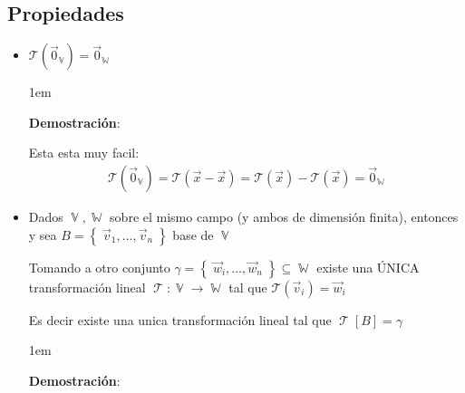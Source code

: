 \documentclass[12pt, fleqn]{report}                             %
\newenvironment{SmallIndentation}[1][0.75em]                    %
        {\begin{adjustwidth}{#1}{}\begin{footnotesize}}             %
        {\end{footnotesize}\end{adjustwidth}}                       %
\theoremstyle{break}                                            %
\DeclareMathOperator \VectorSet    {\mathbb{V}}                 %
\DeclareMathOperator \SubVectorSet {\mathbb{W}}                 %
\DeclareMathOperator \LinTrans {\mathcal{T}}                    %
\newcommand{\Set}[1]    {\left\{ \; #1 \; \right\}}             %
\newcommand{\Wrap}[1]    {\left( #1 \right)}                    %
\newcommand{\FnLinTrans}[1]{\mathcal{T}\Wrap{#1}}               %
\begin{document}
            \clearpage
            \subsection{Propiedades}

                \begin{itemize}
                    \item 
                        $\FnLinTrans{\vec 0_{\VectorSet}} = \vec 0_{\SubVectorSet}$

                        \begin{SmallIndentation}[1em]
                            \textbf{Demostración}:
                            
                            Esta esta muy facil:
                            \begin{align*}
                                \FnLinTrans{\vec 0_{\VectorSet}}
                                    = \FnLinTrans{\vec x - \vec x}                     
                                    = \FnLinTrans{\vec x} - \FnLinTrans{\vec x}        
                                    = \vec 0_{\SubVectorSet}
                            \end{align*}
                        
                        \end{SmallIndentation}

                    \item
                        Dados $\VectorSet, \SubVectorSet$ sobre el mismo campo (y ambos de dimensión finita), entonces y
                        sea $B = \Set{\vec v_1, \dots, \vec v_n}$ base de $\VectorSet$

                        Tomando a otro conjunto $\gamma = \Set{\vec w_i, \dots, \vec w_n} \subseteq \SubVectorSet$
                        existe una ÚNICA transformación lineal $\LinTrans: \VectorSet \to \SubVectorSet$
                        tal que $\FnLinTrans{\vec v_i} = \vec w_i$

                        Es decir existe una unica transformación lineal tal que $\LinTrans[B] = \gamma$

                        \begin{SmallIndentation}[1em]
                            \textbf{Demostración}:
                            

\end{SmallIndentation}
\end{itemize}
\end{document}
